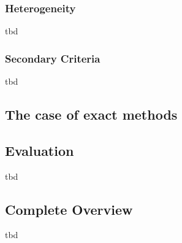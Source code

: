 \subsubsection{Heterogeneity}

tbd
%

%
%

\subsubsection{Secondary Criteria}

tbd

\subsection{The case of exact methods}


\subsection{Evaluation}

tbd




\subsection{Complete Overview}

tbd




\newpage
